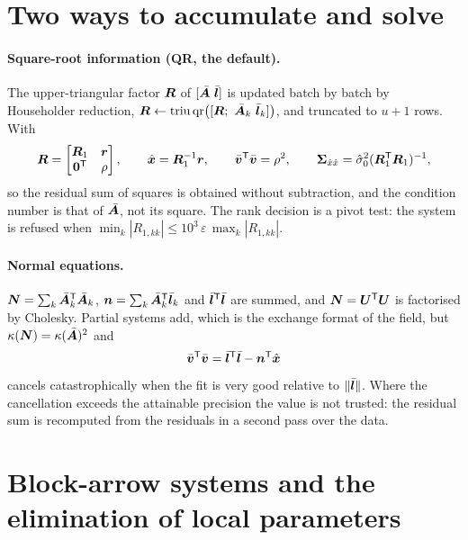 \section{Two ways to accumulate and solve}\label{sec:backends}

\paragraph{Square-root information (QR, the default).} The upper-triangular factor $\bm{R}$ of
$[\bar{\bm{A}}\ \bar{\bm{l}}]$ is updated batch by batch by Householder reduction,
$\bm{R}\leftarrow\operatorname{triu}\operatorname{qr}\bigl([\bm{R};\ \bar{\bm{A}}_k\ \bar{\bm{l}}_k]\bigr)$, and
truncated to $u+1$ rows. With
\[
\bm{R}=\begin{bmatrix}\bm{R}_1 & \bm{r}\\ \bm{0}^{\mathsf T} & \rho\end{bmatrix},\qquad
\hat{\bm{x}}=\bm{R}_1^{-1}\bm{r},\qquad \bar{\bm{v}}^{\mathsf T}\bar{\bm{v}}=\rho^2,\qquad
\bm{\Sigma}_{\hat x\hat x}=\hat\sigma_0^2(\bm{R}_1^{\mathsf T}\bm{R}_1)^{-1},
\]
so the residual sum of squares is obtained without subtraction, and the condition number is
that of $\bar{\bm{A}}$, not its square. The rank decision is a pivot test: the system is
refused when $\min_k|R_{1,kk}|\le 10^3\,\varepsilon\,\max_k|R_{1,kk}|$.

\paragraph{Normal equations.} $\bm{N}=\sum_k\bar{\bm{A}}_k^{\mathsf T}\bar{\bm{A}}_k$,
$\bm{n}=\sum_k\bar{\bm{A}}_k^{\mathsf T}\bar{\bm{l}}_k$ and $\bar{\bm{l}}^{\mathsf T}\bar{\bm{l}}$ are summed, and
$\bm{N}=\bm{U}^{\mathsf T}\bm{U}$ is factorised by Cholesky. Partial systems add, which is the exchange
format of the field, but $\kappa(\bm{N})=\kappa(\bar{\bm{A}})^2$ and
\begin{equation}\label{eq:cancel}
\bar{\bm{v}}^{\mathsf T}\bar{\bm{v}}=\bar{\bm{l}}^{\mathsf T}\bar{\bm{l}}-\bm{n}^{\mathsf T}\hat{\bm{x}}
\end{equation}
cancels catastrophically when the fit is very good relative to $\|\bar{\bm{l}}\|$. Where the
cancellation exceeds the attainable precision the value is not trusted: the residual sum is
recomputed from the residuals in a second pass over the data.

\section{Block-arrow systems and the elimination of local parameters}\label{sec:blockarrow}

